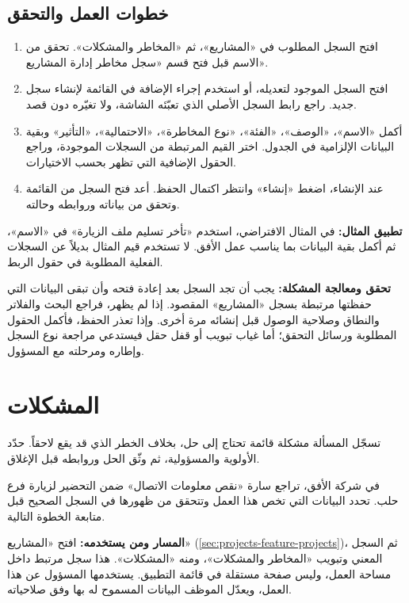 \subsection{خطوات العمل والتحقق}
\begin{enumerate}
\item افتح السجل المطلوب في «المشاريع»، ثم «المخاطر والمشكلات». تحقق من الاسم قبل فتح قسم «سجل مخاطر إدارة المشاريع».
\item افتح السجل الموجود لتعديله، أو استخدم إجراء الإضافة في القائمة لإنشاء سجل جديد. راجع رابط السجل الأصلي الذي تعبّئه الشاشة، ولا تغيّره دون قصد.
\item أكمل «الاسم»، «الوصف»، «الفئة»، «نوع المخاطرة»، «الاحتمالية»، «التأثير» وبقية البيانات الإلزامية في الجدول. اختر القيم المرتبطة من السجلات الموجودة، وراجع الحقول الإضافية التي تظهر بحسب الاختيارات.
\item عند الإنشاء، اضغط «إنشاء» وانتظر اكتمال الحفظ. أعد فتح السجل من القائمة وتحقق من بياناته وروابطه وحالته.
\end{enumerate}

\textbf{تطبيق المثال:} في المثال الافتراضي، استخدم «تأخر تسليم ملف الزيارة» في «الاسم»، ثم أكمل بقية البيانات بما يناسب عمل الأفق. لا تستخدم قيم المثال بديلاً عن السجلات الفعلية المطلوبة في حقول الربط.

\textbf{تحقق ومعالجة المشكلة:} يجب أن تجد السجل بعد إعادة فتحه وأن تبقى البيانات التي حفظتها مرتبطة بسجل «المشاريع» المقصود. إذا لم يظهر، فراجع البحث والفلاتر والنطاق وصلاحية الوصول قبل إنشائه مرة أخرى. وإذا تعذر الحفظ، فأكمل الحقول المطلوبة ورسائل التحقق؛ أما غياب تبويب أو قفل حقل فيستدعي مراجعة نوع السجل وإطاره ومرحلته مع المسؤول.

\clearpage
\section{المشكلات}
\label{sec:projects-feature-issues}

تسجّل المسألة مشكلة قائمة تحتاج إلى حل، بخلاف الخطر الذي قد يقع لاحقاً. حدّد الأولوية والمسؤولية، ثم وثّق الحل وروابطه قبل الإغلاق.

\begin{rcnote}
في شركة الأفق، تراجع سارة «نقص معلومات الاتصال» ضمن التحضير لزيارة فرع حلب. تحدد البيانات التي تخص هذا العمل وتتحقق من ظهورها في السجل الصحيح قبل متابعة الخطوة التالية.
\end{rcnote}

\textbf{المسار ومن يستخدمه:} افتح «المشاريع» (\ref{sec:projects-feature-projects})، ثم السجل المعني وتبويب «المخاطر والمشكلات»، ومنه «المشكلات». هذا سجل مرتبط داخل مساحة العمل، وليس صفحة مستقلة في قائمة التطبيق. يستخدمها المسؤول عن هذا العمل، ويعدّل الموظف البيانات المسموح له بها وفق صلاحياته.

